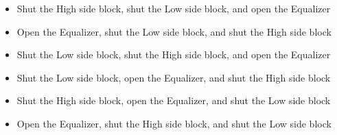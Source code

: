 \begin{itemize}
\item{} Shut the High side block, shut the Low side block, and open the Equalizer
\vskip 5pt 
\item{} Open the Equalizer, shut the Low side block, and shut the High side block
\vskip 5pt 
\item{} Shut the Low side block, shut the High side block, and open the Equalizer
\vskip 5pt 
\item{} Shut the Low side block, open the Equalizer, and shut the High side block
\vskip 5pt 
\item{} Shut the High side block, open the Equalizer, and shut the Low side block 
\vskip 5pt 
\item{} Open the Equalizer, shut the High side block, and shut the Low side block
\end{itemize}




